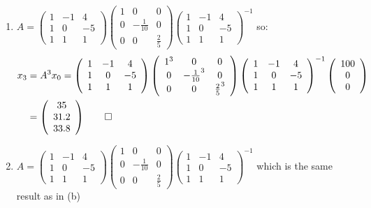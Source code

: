 \documentclass[12pt, a4paper]{article}
\begin{document}
\begin{enumerate}[Q\arabic*.]
\begin{enumerate}[(\alph*)]
      \item $A = \left(\begin{array}{ccc} 1 & -1 & 4\\ 1 & 0 & -5\\ 1 & 1 & 1 \end{array}\right)\left(\begin{array}{ccc} 1 & 0 & 0\\ 0 & -\frac{1}{10} & 0\\ 0 & 0 & \frac{2}{5} \end{array}\right) \left(\begin{array}{ccc} 1 & -1 & 4\\ 1 & 0 & -5\\ 1 & 1 & 1 \end{array}\right)^{-1}$ so:
        \begin{align*}
          x_3 &= A^3x_0 = \left(\begin{array}{ccc} 1 & -1 & 4\\ 1 & 0 & -5\\ 1 & 1 & 1 \end{array}\right)\left(\begin{array}{ccc} 1^3 & 0 & 0\\ 0 & -\frac{1}{10}^3 & 0\\ 0 & 0 & \frac{2}{5}^3 \end{array}\right) \left(\begin{array}{ccc} 1 & -1 & 4\\ 1 & 0 & -5\\ 1 & 1 & 1 \end{array}\right)^{-1}\left(\begin{array}{c} 100\\ 0\\ 0 \end{array}\right)\\
              &= \left(\begin{array}{c} 35\\ 31.2\\ 33.8 \end{array}\right) \qed
        \end{align*}


      \item $A = \left(\begin{array}{ccc} 1 & -1 & 4\\ 1 & 0 & -5\\ 1 & 1 & 1 \end{array}\right)\left(\begin{array}{ccc} 1 & 0 & 0\\ 0 & -\frac{1}{10} & 0\\ 0 & 0 & \frac{2}{5} \end{array}\right) \left(\begin{array}{ccc} 1 & -1 & 4\\ 1 & 0 & -5\\ 1 & 1 & 1 \end{array}\right)^{-1}$ which is the same result as in (b)


\end{enumerate}
\end{enumerate}
\end{document}
